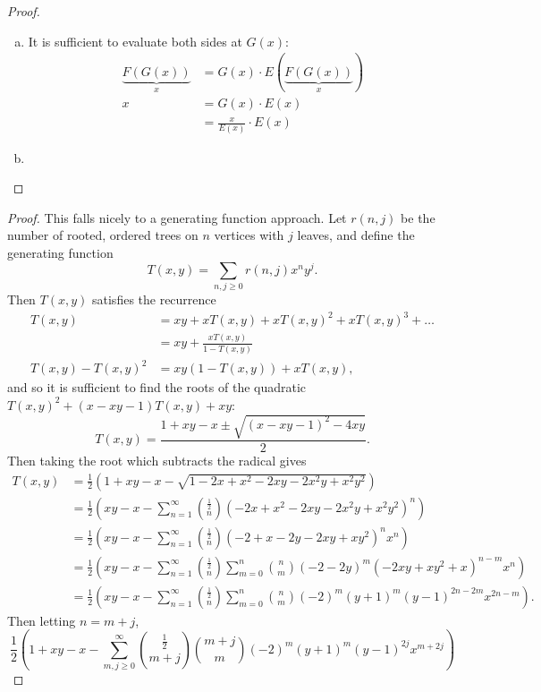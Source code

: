 \documentclass{article}
\newenvironment{problem}[2][Problem]{\begin{trivlist}
\item[\hskip \labelsep {\bfseries #1}\hskip \labelsep {\bfseries #2.}]}{\end{trivlist}}
\newcommand{\paren}[1]{\left( #1 \right)}
\begin{document}
\begin{proof} ~
  \begin{enumerate}[(a)]
    \item It is sufficient to evaluate both sides at $G(x)$: \begin{align*}
      \underbrace{F(G(x))}_{x} &= G(x) \cdot E(\underbrace{F(G(x))}_x) \\
      x &= G(x) \cdot E(x) \\
      &= \frac{x}{E(x)}\cdot E(x)
    \end{align*}
    \item
  \end{enumerate}
\end{proof}
\pagebreak
\begin{problem}{3}
\end{problem}

\begin{proof}
  This falls nicely to a generating function approach. Let $r(n, j)$ be the
  number of rooted, ordered trees on $n$ vertices with $j$ leaves, and define
  the generating function \[
    T(x,y) = \sum_{n, j \geq 0} r(n, j) x^n y^j.
  \]
  Then $T(x,y)$ satisfies the recurrence \begin{align*}
    T(x, y) &= xy + xT(x,y) + xT(x,y)^2 + xT(x,y)^3 + \hdots \\
            &= xy + \frac{xT(x,y)}{1-T(x,y)} \\
    T(x, y) - T(x, y)^2 &=   xy(1-T(x,y)) + xT(x,y),
  \end{align*} and so it is sufficient to find the roots of the quadratic
  $T(x, y)^2 + (x - xy - 1)T(x, y) + xy$: \[
    T(x,y) = \frac{1 + xy - x \pm \sqrt{(x - xy - 1)^2 - 4xy}}{2}.
  \]
  Then taking the root which subtracts the radical gives \begin{align*}
    T(x,y)
    &= \frac 12\paren{1 + xy - x - \sqrt{1 - 2 x + x^2 - 2 x y - 2 x^2 y + x^2 y^2}} \\
    &= \frac 12\paren{
      xy - x - \sum_{n=1}^\infty\binom{\frac12}{n}(-2x + x^2 - 2 x y - 2 x^2 y + x^2 y^2)^n
    } \\
    &= \frac 12\paren{
      xy - x - \sum_{n=1}^\infty\binom{\frac12}{n}(-2 + x - 2y - 2 x y + x y^2)^n x^n
    }\\
    &= \frac 12\paren{
      xy - x - \sum_{n=1}^\infty\binom{\frac12}{n}\sum_{m=0}^n\binom{n}{m}(-2 - 2y)^m(- 2 x y + x y^2 + x)^{n-m} x^n
    } \\
    &= \frac 12\paren{
      xy - x - \sum_{n=1}^\infty\binom{\frac12}{n}\sum_{m=0}^n\binom{n}{m}(-2)^m(y + 1)^m(y - 1)^{2n-2m} x^{2n-m}
    }.
  \end{align*}
  Then letting $n = m + j$, \[
  \frac 12\paren{
    1 + xy - x - \sum_{m,j\geq0}^\infty\binom{\frac12}{m+j}\binom{m+j}{m}(-2)^m(y + 1)^m(y - 1)^{2j} x^{m + 2j}
  }
  \]
\end{proof}
\begin{problem}{4}
\end{problem}
\end{document}
